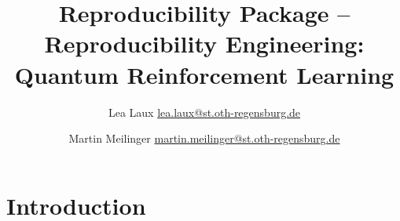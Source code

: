 \documentclass{article}
\title{Reproducibility Package -- Reproducibility Engineering: Quantum Reinforcement Learning}
\author{Lea Laux \href{mailto:lea.laux@st.oth-regensburg.de}{lea.laux@st.oth-regensburg.de}  \and 
 Martin Meilinger \href{mailto:martin.meilinger@st.oth-regensburg.de}{martin.meilinger@st.oth-regensburg.de}}
\begin{document}
\maketitle


\section{Introduction}
\printbibliography
\end{document}
